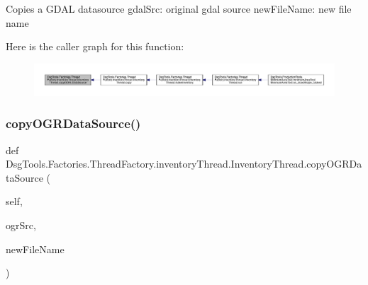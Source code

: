 \begin{DoxyVerb}Copies a GDAL datasource
gdalSrc: original gdal source
newFileName: new file name
\end{DoxyVerb}
 Here is the caller graph for this function\+:
\nopagebreak
\begin{figure}[H]
\begin{center}
\leavevmode
\includegraphics[width=350pt]{class_dsg_tools_1_1_factories_1_1_thread_factory_1_1inventory_thread_1_1_inventory_thread_a6e4afaa58fc22a337235d79b6aa06f6d_icgraph}
\end{center}
\end{figure}
\mbox{\label{class_dsg_tools_1_1_factories_1_1_thread_factory_1_1inventory_thread_1_1_inventory_thread_acbdf2851ff289aae0cd231501bec641b}} 
\subsubsection{\texorpdfstring{copy\+O\+G\+R\+Data\+Source()}{copyOGRDataSource()}}
{\footnotesize\ttfamily def Dsg\+Tools.\+Factories.\+Thread\+Factory.\+inventory\+Thread.\+Inventory\+Thread.\+copy\+O\+G\+R\+Data\+Source (\begin{DoxyParamCaption}\item[{}]{self,  }\item[{}]{ogr\+Src,  }\item[{}]{new\+File\+Name }\end{DoxyParamCaption})}

